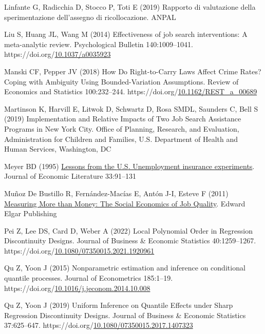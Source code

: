 \documentclass[
  11pt]{article}
\newlength{\cslhangindent}
\newenvironment{CSLReferences}[2] %
 {\begin{list}{}{%
  \setlength{\itemindent}{0pt}
  \setlength{\leftmargin}{0pt}
  \setlength{\parsep}{0pt}
  \ifodd #1
   \setlength{\leftmargin}{\cslhangindent}
   \setlength{\itemindent}{-1\cslhangindent}
  \fi
  \setlength{\itemsep}{#2\baselineskip}}}
 {\end{list}}
\begin{document}
\begin{CSLReferences}{1}{1}
Linfante G, Radicchia D, Stocco P, Toti E (2019) Rapporto di valutazione
della sperimentazione dell'assegno di ricollocazione. ANPAL

Liu S, Huang JL, Wang M (2014) Effectiveness of job search
interventions: {A} meta-analytic review. Psychological Bulletin
140:1009--1041.
https://doi.org/\href{https://doi.org/10.1037/a0035923}{10.1037/a0035923}

Manski CF, Pepper JV (2018) How {Do Right-to-Carry Laws Affect Crime
Rates}? {Coping} with {Ambiguity Using Bounded-Variation Assumptions}.
Review of Economics and Statistics 100:232--244.
https://doi.org/\href{https://doi.org/10.1162/REST_a_00689}{10.1162/REST\_a\_00689}

Martinson K, Harvill E, Litwok D, Schwartz D, Rosa SMDL, Saunders C,
Bell S (2019) Implementation and {Relative Impacts} of {Two Job Search
Assistance Programs} in {New York City}. {Office of Planning, Research,
and Evaluation, Administration for Children and Families, U.S.
Department of Health and Human Services}, Washington, DC

Meyer BD (1995) \href{https://www.jstor.org/stable/2728911}{Lessons from
the {U}.{S}. Unemployment insurance experiments}. Journal of Economic
Literature 33:91--131

Muñoz De Bustillo R, Fernández-Macías E, Antón J-I, Esteve F (2011)
\href{https://doi.org/10.4337/9781849805919}{Measuring {More} than
{Money}: {The Social Economics} of {Job Quality}}. Edward Elgar
Publishing

Pei Z, Lee DS, Card D, Weber A (2022) Local {Polynomial Order} in
{Regression Discontinuity Designs}. Journal of Business \& Economic
Statistics 40:1259--1267.
https://doi.org/\href{https://doi.org/10.1080/07350015.2021.1920961}{10.1080/07350015.2021.1920961}

Qu Z, Yoon J (2015) Nonparametric estimation and inference on
conditional quantile processes. Journal of Econometrics 185:1--19.
https://doi.org/\href{https://doi.org/10.1016/j.jeconom.2014.10.008}{10.1016/j.jeconom.2014.10.008}

Qu Z, Yoon J (2019) Uniform {Inference} on {Quantile Effects} under
{Sharp Regression Discontinuity Designs}. Journal of Business \&
Economic Statistics 37:625--647.
https://doi.org/\href{https://doi.org/10.1080/07350015.2017.1407323}{10.1080/07350015.2017.1407323}


\end{CSLReferences}
\end{document}
